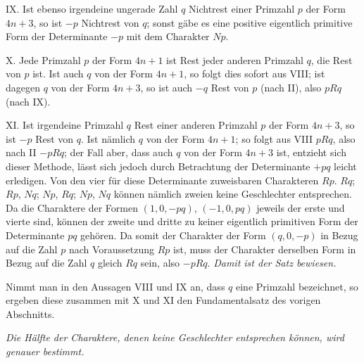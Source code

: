 IX. Ist ebenso irgendeine ungerade Zahl $q$ Nichtrest einer Primzahl $p$ der Form $4n+3$, so ist $-p$ Nichtrest von $q$; sonst gäbe es eine positive eigentlich primitive Form der Determinante $-p$ mit dem Charakter $Np$.

X. Jede Primzahl $p$ der Form $4n+1$ ist Rest jeder anderen Primzahl $q$, die Rest von $p$ ist. Ist auch $q$ von der Form $4n+1$, so folgt dies sofort aus VIII; ist dagegen $q$ von der Form $4n+3$, so ist auch $-q$ Rest von $p$ (nach II), also $pRq$ (nach IX).

XI. Ist irgendeine Primzahl $q$ Rest einer anderen Primzahl $p$ der Form $4n+3$, so ist $-p$ Rest von $q$. Ist nämlich $q$ von der Form $4n+1$; so folgt aus VIII $pRq$, also nach II $-pRq$; der Fall aber, dass auch $q$ von der Form $4n+3$ ist, entzieht sich dieser Methode, lässt sich jedoch durch Betrachtung der Determinante $+pq$ leicht erledigen. Von den vier für diese Determinante zuweisbaren Charakteren $Rp$. $Rq$; $Rp$, $Nq$; $Np$, $Rq$; $Np$, $Nq$ können nämlich zweien keine Geschlechter entsprechen. Da die Charaktere der Formen $(1,0,-pq)$, $(-1,0,pq)$ jeweils der erste und vierte sind, können der zweite und dritte zu keiner eigentlich primitiven Form der Determinante $pq$ gehören. Da somit der Charakter der Form $(q,0,-p)$ in Bezug auf die Zahl $p$ nach Voraussetzung $Rp$ ist, muss der Charakter derselben Form in Bezug auf die Zahl $q$ gleich $Rq$ sein, also $-pRq$. \textit{Damit ist der Satz bewiesen.}

Nimmt man in den Aussagen VIII und IX an, dass $q$ eine Primzahl bezeichnet, so ergeben diese zusammen mit X und XI den Fundamentalsatz des vorigen Abschnitts.
\begin{center}
\textit{Die Hälfte der Charaktere, denen keine Geschlechter entsprechen können, wird genauer bestimmt.}
\end{center}

